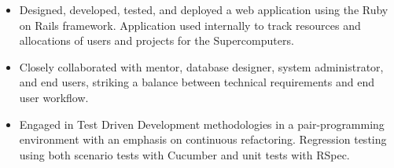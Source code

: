 \documentclass[12pt,letterpaper]{article}
\begin{document}
\begin{itemize}

	\item Designed, developed, tested, and deployed a web application using the Ruby
	on Rails framework. Application used internally to track resources and allocations
  of users and projects for the Supercomputers.

  \item Closely collaborated with mentor, database designer, system administrator, and end users, striking a balance between technical requirements and end user workflow.

  \item Engaged in Test Driven Development methodologies in a pair-programming environment
  with an emphasis on continuous refactoring.
  Regression testing using both scenario tests with Cucumber and unit tests with RSpec.

\end{itemize}


%
%
%
%







\end{document}
